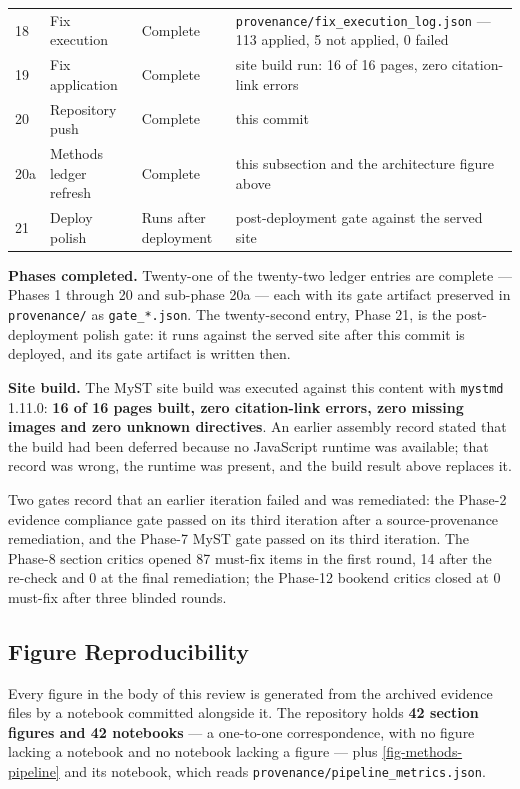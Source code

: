 \documentclass[11pt]{article}
\begin{document}
\begin{table}[H]
\begin{tabular}{llll}
18 & Fix execution & Complete & \texttt{provenance/fix\_execution\_log.json} --- 113 applied, 5 not applied, 0 failed \\
19 & Fix application & Complete & site build run: 16 of 16 pages, zero citation-link errors \\
20 & Repository push & Complete & this commit \\
20a & Methods ledger refresh & Complete & this subsection and the architecture figure above \\
21 & Deploy polish & Runs after deployment & post-deployment gate against the served site \\
\bottomrule
\end{tabular}
\end{table}

\textbf{Phases completed.} Twenty-one of the twenty-two ledger entries are complete --- Phases 1 through 20 and sub-phase 20a --- each with its gate artifact preserved in \texttt{provenance/} as \texttt{gate\_*.json}. The twenty-second entry, Phase 21, is the post-deployment polish gate: it runs against the served site after this commit is deployed, and its gate artifact is written then.

\textbf{Site build.} The MyST site build was executed against this content with \texttt{mystmd} 1.11.0: \textbf{16 of 16 pages built, zero citation-link errors, zero missing images and zero unknown directives}. An earlier assembly record stated that the build had been deferred because no JavaScript runtime was available; that record was wrong, the runtime was present, and the build result above replaces it.

Two gates record that an earlier iteration failed and was remediated: the Phase-2 evidence compliance gate passed on its third iteration after a source-provenance remediation, and the Phase-7 MyST gate passed on its third iteration. The Phase-8 section critics opened 87 must-fix items in the first round, 14 after the re-check and 0 at the final remediation; the Phase-12 bookend critics closed at 0 must-fix after three blinded rounds.

\subsection{Figure Reproducibility}
\label{sec-methods-figures}

Every figure in the body of this review is generated from the archived evidence files by a notebook committed alongside it. The repository holds \textbf{42 section figures and 42 notebooks} --- a one-to-one correspondence, with no figure lacking a notebook and no notebook lacking a figure --- plus \ref{fig-methods-pipeline} and its notebook, which reads \texttt{provenance/pipeline\_metrics.json}.
\end{document}
